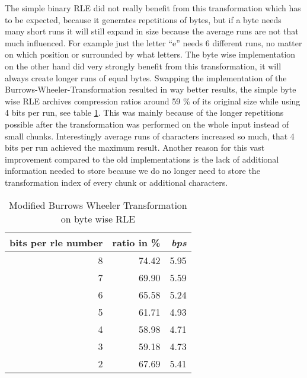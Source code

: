 \par{
The simple binary RLE did not really benefit from this transformation which has to be expected, because it generates repetitions of bytes, but if a byte needs many short runs it will still expand in size because the average runs are not that much influenced. For example just the letter \enquote{e} needs 6 different runs, no matter on which position or surrounded by what letters. The byte wise implementation on the other hand did very strongly benefit from this transformation, it will always create longer runs of equal bytes. Swapping the implementation of the Burrows-Wheeler-Transformation resulted in way better results, the simple byte wise RLE archives compression ratios around 59 \% of its original size while using 4 bits per run, see table \ref{tab:t13 Modified Burrows Wheeler Transformation on byte wise RLE}. This was mainly because of the longer repetitions possible after the transformation was performed on the whole input instead of small chunks. Interestingly average runs of characters increased so much, that 4 bits per run achieved the maximum result. Another reason for this vast improvement compared to the old implementations is the lack of additional information needed to store because we do no longer need to store the transformation index of every chunk or additional characters.
	\begin{table}[h]
		\centering
		\begin{tabular}{r|r|r}	
			bits per rle number & ratio in \% & \textit{bps}\\
			\hline
			8 & 74.42 & 5.95\\
			7 & 69.90 & 5.59\\
			6 & 65.58 & 5.24\\
			5 & 61.71 & 4.93\\
			4 & 58.98 & 4.71\\
			3 & 59.18 & 4.73\\
			2 & 67.69 & 5.41
		\end{tabular}
		\caption{Modified Burrows Wheeler Transformation on byte wise RLE}
		\label{tab:t13 Modified Burrows Wheeler Transformation on byte wise RLE}
	\end{table}
}
